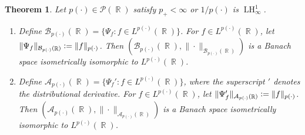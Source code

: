 \documentclass[11pt,reqno]{amsart}
\newtheorem{theorem}{Theorem}[section]
\theoremstyle{definition}
\theoremstyle{definition}
\theoremstyle{definition}
\DeclareMathOperator{\R}{\mathbb{R}}
\newcommand{\p}{p(\cdot)}
\newcommand{\Lp}{L^{\p}(\R)}
\newcommand{\defeq}{\vcentcolon=}
\newcommand{\LH}{\operatorname{LH}_\infty^1}
\begin{document}
\begin{theorem}\label{theo_1}
     Let $\p\in \mathcal{P}(\R)$ satisfy $p_{+}<\infty$ or $1/\p$ is $\LH$.
     \begin{enumerate}
         \item Define $\mathcal{B}_{p(\cdot)}(\R) = \{\Psi_f : f\in L^{p(\cdot)}(\R)\}$. For $f\in L^{\p}(\R)$, let $\|\Psi_f\|_{\mathcal{B}_{\p}(\R)}\defeq\|f\|_{\p}$. Then  $\left(\mathcal{B}_{p(\cdot)}(\R),\|\cdot\|_{\mathcal{B}_{\p}(\R)}\right)$ is a Banach space isometrically isomorphic to $L^{\p}(\R)$.
         \item Define $\mathcal{A}_{\p}(\R) = \{\Psi_f': f\in L^{\p}(\R)\}$, where the superscript $'$ denotes the distributional derivative. For $f\in L^{\p}(\R)$, let $\|\Psi_f'\|_{\mathcal{A}_{\p}(\R)}\defeq\|f\|_{\p}$. Then 
         \noindent $\left(\mathcal{A}_{\p}(\R),\|\cdot\|_{\mathcal{A}_{\p}(\R)}\right)$ is a Banach space isometrically isomorphic to $\Lp$.
     \end{enumerate}
\end{theorem}
\end{document}
